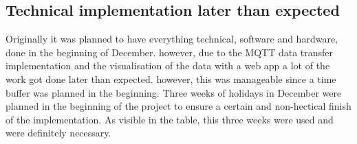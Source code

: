 \subsection{Technical implementation later than expected}

Originally it was planned to have everything technical, software and hardware, done in the beginning of December. however, due to the MQTT data transfer implementation and the visualisation of the data with a web app a lot of the work got done later than expected. however, this was manageable since a time buffer was planned in the beginning. Three weeks of holidays in December were planned in the beginning of the project to ensure a certain and non-hectical finish of the implementation. As visible in the table, this three weeks were used and were definitely necessary. 
